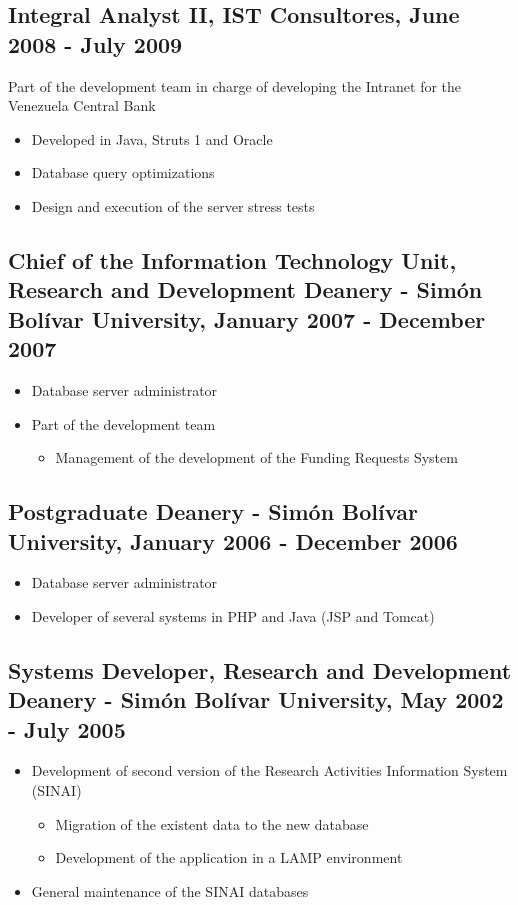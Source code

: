 \documentclass[letterpaper,11pt]{report}
\begin{document}
\subsection*{Integral Analyst II, IST Consultores, June 2008 - July 2009}
Part of the development team in charge of developing the Intranet for the Venezuela Central Bank
\begin{itemize}
\item Developed in Java, Struts 1 and Oracle
\item Database query optimizations
\item Design and execution of the server stress tests
\end{itemize}


\subsection*{Chief of the Information Technology Unit, Research and Development Deanery - Simón Bolívar University, January 2007 - December 2007}
\begin{itemize}
\item Database server administrator
\item Part of the development team
\begin{itemize}
	\item Management of the development of the Funding Requests System
\end{itemize}
\end{itemize}

\subsection*{Postgraduate Deanery - Simón Bolívar University, January 2006 - December 2006}
\begin{itemize}
\item Database server administrator
\item Developer of several systems in PHP and Java (JSP and Tomcat)
\end{itemize}

\subsection*{Systems Developer, Research and Development Deanery - Simón Bolívar University, May 2002 - July 2005}
\begin{itemize}
\item Development of second version of the Research Activities Information System (SINAI)
\begin{itemize}
	\item Migration of the existent data to the new database
	\item Development of the application in a LAMP environment
\end{itemize}
\item General maintenance of the SINAI databases
\end{itemize}
\end{document}

